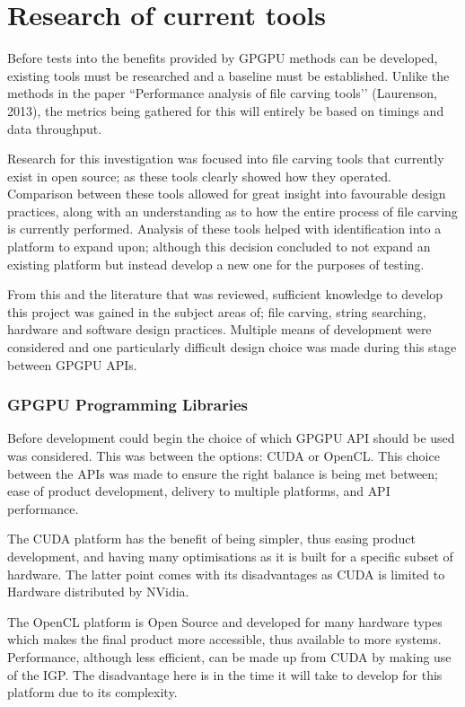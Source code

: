 \section{Research of current tools}
Before tests into the benefits provided by GPGPU methods can be developed, existing tools must be researched and a baseline must be established.
Unlike the methods in the paper ``Performance analysis of file carving tools’’ (Laurenson, 2013), the metrics being gathered for this will entirely be based on timings and data throughput.

Research for this investigation was focused into file carving tools that currently exist in open source; as these tools clearly showed how they operated.
Comparison between these tools allowed for great insight into favourable design practices, along with an understanding as to how the entire process of file carving is currently performed.
Analysis of these tools helped with identification into a platform to expand upon; although this decision concluded to not expand an existing platform but instead develop a new one for the purposes of testing.

From this and the literature that was reviewed, sufficient knowledge to develop this project was gained in the subject areas of; file carving, string searching, hardware and software design practices.
Multiple means of development were considered and one particularly difficult design choice was made during this stage between GPGPU \ac{API}s.

\subsubsection*{GPGPU Programming Libraries}
Before development could begin the choice of which \ac{GPGPU} \acf{API} should be used was considered.
This was between the options: CUDA or OpenCL.
This choice between the \acp{API} was made to ensure the right balance is being met between; ease of product development, delivery to multiple platforms, and \ac{API} performance.

The CUDA platform has the benefit of being simpler, thus easing product development, and having many optimisations as it is built for a specific subset of hardware.
The latter point comes with its disadvantages as CUDA is limited to Hardware distributed by NVidia.

The OpenCL platform is Open Source and developed for many hardware types which makes the final product more accessible, thus available to more systems.
Performance, although less efficient, can be made up from CUDA by making use of the \acf{IGP}.
The disadvantage here is in the time it will take to develop for this platform due to its complexity.

